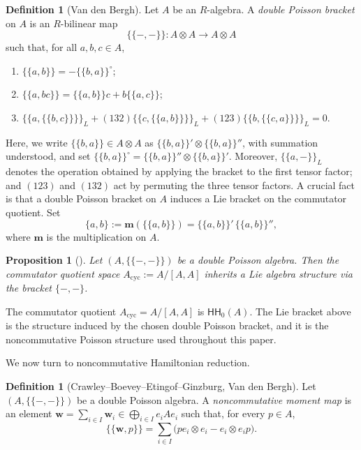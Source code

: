 \documentclass[11pt,reqno]{amsart}
\newtheorem{proposition}[theorem]{Proposition}
\theoremstyle{definition}
\newtheorem{definition}[theorem]{Definition}
\newcommand{\bm}{ \mathbf{m}}
\newcommand{\ldb}{\mathopen{\{\!\!\{}}
\newcommand{\rdb}{\mathclose{\}\!\!\}}}
\newcommand{\bw}{\mathbf{w}}
\newcommand{\HH}{\mathsf{HH}}
\newcommand{\cyc}{\mathrm{cyc}}
\begin{document}
\begin{definition}[Van den Bergh]
\label{def: dpois bracket}
Let \(A\) be an \(R\)-algebra. A \emph{double Poisson bracket} on \(A\) is an \(R\)-bilinear map
\[
\ldb-,-\rdb\colon A\otimes A\to A\otimes A
\]
such that, for all \(a,b,c\in A\),
\begin{enumerate}
\item \(\ldb a,b\rdb=-\ldb b,a\rdb^\circ\);

\item \(\ldb a,bc\rdb=\ldb a,b\rdb c+b\ldb a,c\rdb\);

\item \(\ldb a,\ldb b,c\rdb\rdb_L+(132)\ldb c,\ldb a,b\rdb\rdb_L+(123)\ldb b,\ldb c,a\rdb\rdb_L=0\).
\end{enumerate}
\end{definition}


Here, we write
\({\ldb b,a\rdb\in A\otimes A}\)
as \(\ldb b,a\rdb'\otimes\ldb b,a\rdb''\), with summation understood, and set
\(
\ldb b,a\rdb^\circ=\ldb b,a\rdb''\otimes\ldb b,a\rdb'
\).
Moreover, \(\ldb a,-\rdb_L\) denotes the operation obtained by applying the bracket to the first tensor factor;
and \((123)\) and \((132)\) act by permuting the three tensor factors.
{A crucial fact is that a double Poisson bracket on \(A\)
induces a Lie bracket on the commutator quotient.
Set
\[
\{a,b\}:=\bm(\ldb a,b\rdb)=\ldb a,b\rdb'\,\ldb a,b\rdb'' ,
\]
where $\bm$ is the multiplication on $A$.}

\begin{proposition}[{\cite[Corollary 2.4.6]{Van2008Double}}]
\label{prop: induced Lie bracket}
Let \((A,\ldb-,-\rdb)\) be a double Poisson algebra. Then the commutator quotient space
\(A_\cyc:=A/[A,A]\) inherits a Lie algebra structure via the bracket \(\{-,-\}\).
\end{proposition}

The commutator quotient \(A_\cyc=A/[A,A]\) is \(\HH_0(A)\).  The Lie bracket above is the structure
induced by the chosen double Poisson bracket, and it is the
noncommutative Poisson structure used throughout this paper.




We now turn to noncommutative Hamiltonian reduction.

\begin{definition}[Crawley--Boevey--Etingof--Ginzburg, Van den Bergh]\label{def: nc moment map}
Let \((A,\ldb-,-\rdb)\) be a double Poisson algebra. A \emph{noncommutative moment map} is an element \(\bw=\sum_{i\in I}\bw_i\in\bigoplus_{i\in I}e_iAe_i\) such that, for every \(p\in A\),
\[
\ldb\bw,p\rdb=\sum_{i\in I}\bigl(pe_i\otimes e_i-e_i\otimes e_ip\bigr).
\]
\end{definition}
\end{document}
